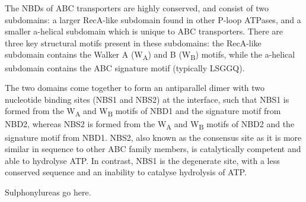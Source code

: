 The NBDs of ABC transporters are highly conserved, and consist of two subdomains: a larger RecA-like subdomain found in other P-loop ATPases, and a smaller \textgreek{a}-helical subdomain which is unique to ABC transporters.
There are three key structural motifs present in these subdomains: the RecA-like subdomain contains the Walker A (W\textsubscript{A}) and B (W\textsubscript{B}) motifs, while the \textgreek{a}-helical subdomain contains the ABC signature motif (typically LSGGQ).

The two domains come together to form an antiparallel dimer with two nucleotide binding sites (NBS1 and NBS2) at the interface, such that NBS1 is formed from the W\textsubscript{A} and W\textsubscript{B} motifs of NBD1 and the signature motif from NBD2, whereas NBS2 is formed from the W\textsubscript{A} and W\textsubscript{B} motifs of NBD2 and the signature motif from NBD1.
NBS2, also known as the consensus site as it is more similar in sequence to other ABC family members, is catalytically competent and able to hydrolyse ATP.
In contrast, NBS1 is the degenerate site, with a less conserved sequence and an inability to catalyse hydrolysis of ATP.

Sulphonylureas go here.

